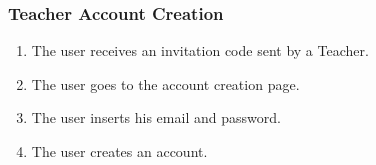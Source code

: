 \subsubsection{Teacher Account Creation}

\begin{enumerate}
    \item The user receives an invitation code sent by a Teacher.
    \item The user goes to the account creation page.
    \item The user inserts his email and password.
    \item The user creates an account.
\end{enumerate}